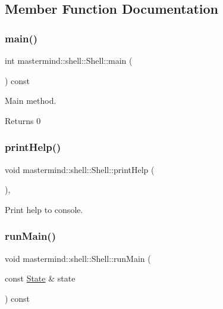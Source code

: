 \subsection{Member Function Documentation}
\hypertarget{classmastermind_1_1shell_1_1_shell_ae0b334aea0b022f03424f70593a40a9b}{}\label{classmastermind_1_1shell_1_1_shell_ae0b334aea0b022f03424f70593a40a9b} 
\subsubsection{\texorpdfstring{main()}{main()}}
{\footnotesize\ttfamily int mastermind\+::shell\+::\+Shell\+::main (\begin{DoxyParamCaption}{ }\end{DoxyParamCaption}) const}



Main method. 

\begin{DoxyReturn}{Returns}
0 
\end{DoxyReturn}
\hypertarget{classmastermind_1_1shell_1_1_shell_afa07030d8818db52935dcba29b25d708}{}\label{classmastermind_1_1shell_1_1_shell_afa07030d8818db52935dcba29b25d708} 
\subsubsection{\texorpdfstring{print\+Help()}{printHelp()}}
{\footnotesize\ttfamily void mastermind\+::shell\+::\+Shell\+::print\+Help (\begin{DoxyParamCaption}{ }\end{DoxyParamCaption})\hspace{0.3cm}{\ttfamily [static]}, {\ttfamily [protected]}}



Print help to console. 

\hypertarget{classmastermind_1_1shell_1_1_shell_ab74c8abb6d0caac122de8906bbcc6a3c}{}\label{classmastermind_1_1shell_1_1_shell_ab74c8abb6d0caac122de8906bbcc6a3c} 
\subsubsection{\texorpdfstring{run\+Main()}{runMain()}}
{\footnotesize\ttfamily void mastermind\+::shell\+::\+Shell\+::run\+Main (\begin{DoxyParamCaption}\item[{const \hyperlink{classmastermind_1_1shell_1_1_state}{State} \&}]{state }\end{DoxyParamCaption}) const\hspace{0.3cm}{\ttfamily [protected]}}



